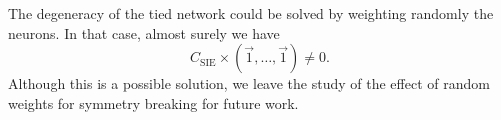 The degeneracy of the tied network could be solved by weighting randomly the neurons. In that case, almost surely we have
\begin{equation}
    C_\mathrm{SIE} \times (\vec{1},\dots,\vec{1}) \neq 0.
\end{equation}
Although this is a possible solution, we leave the study of the effect of random weights for symmetry breaking for future work.
